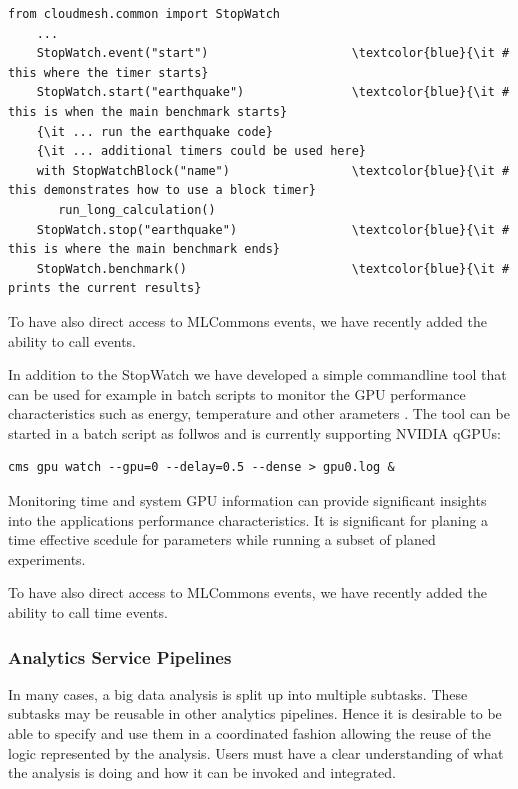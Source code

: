 \documentclass[utf8]{FrontiersinVancouver} %
\begin{document}
{{\footnotesize
\begin{Verbatim}[commandchars=\\\{\}]
    from cloudmesh.common import StopWatch 
    ...
    StopWatch.event("start")                    \textcolor{blue}{\it # this where the timer starts}
    StopWatch.start("earthquake")               \textcolor{blue}{\it # this is when the main benchmark starts}
    {\it ... run the earthquake code}
    {\it ... additional timers could be used here}
    with StopWatchBlock("name")                 \textcolor{blue}{\it # this demonstrates how to use a block timer}
       run_long_calculation()
    StopWatch.stop("earthquake")                \textcolor{blue}{\it # this is where the main benchmark ends}
    StopWatch.benchmark()                       \textcolor{blue}{\it # prints the current results}
\end{Verbatim}
}

To have also direct access to MLCommons events, we have recently added
the ability to call events.


In addition to the StopWatch we have developed a simple commandline
tool that can be used for example in batch scripts to monitor the GPU
performance characteristics such as energy, temperature and other
arameters \citep{cloudmesh-gpu}. The tool can be started in a batch
script as follwos and is currently supporting NVIDIA qGPUs:

{\footnotesize
\begin{Verbatim}[commandchars=\\\{\}]
    cms gpu watch --gpu=0 --delay=0.5 --dense > gpu0.log &
\end{Verbatim}
}


Monitoring time and system GPU information can provide significant
insights into the applications performance characteristics. It is
significant for planing a time effective scedule for parameters while
running a subset of planed experiments.

To have also direct access to MLCommons events, we have recently added
the ability to call time events.


\subsubsection{Analytics Service Pipelines}

In many cases, a big data analysis is split up into multiple
subtasks. These subtasks may be reusable in other analytics
pipelines. Hence it is desirable to be able to specify and use them in
a coordinated fashion allowing the reuse of the logic represented by
the analysis. Users must have a clear understanding of what the
analysis is doing and how it can be invoked and integrated.

}
\end{document}
